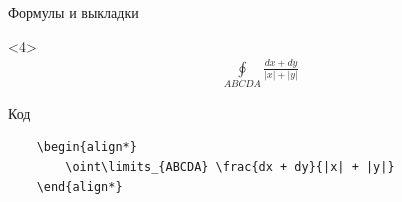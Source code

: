 \begin{frame}[fragile]{Формулы и выкладки}
\begin{onlyenv}<4>
    \begin{align*}
        \oint\limits_{ABCDA} \frac{dx + dy}{|x| + |y|}
    \end{align*}

    \begin{block}{Код}
        \begin{lstlisting}
    \begin{align*}
        \oint\limits_{ABCDA} \frac{dx + dy}{|x| + |y|}
    \end{align*}
        \end{lstlisting}
    \end{block}
\end{onlyenv}

\end{frame}


